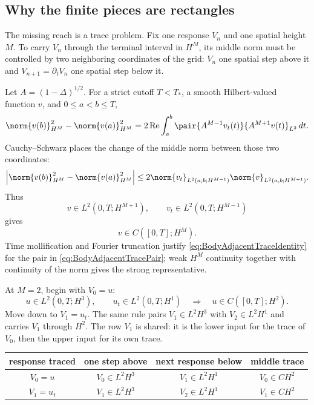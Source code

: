 \subsection{Why the finite pieces are rectangles}\label{sub:BodyFiniteAdjacentRectangles}

The missing reach is a trace problem.
Fix one response \(V_n\) and one spatial height \(M\).
To carry \(V_n\) through the terminal interval in \(H^M\), its middle norm must be controlled by two neighboring coordinates of the grid: \(V_n\) one spatial step above it and \(V_{n+1}=\partial_tV_n\) one spatial step below it.

Let \(A=(1-\Delta)^{1/2}\).
For a strict cutoff \(T<T_*\), a smooth Hilbert-valued function \(v\), and \(0\leq a<b\leq T\),
\begin{equation}\label{eq:BodyAdjacentTraceIdentity}
  \norm{v(b)}_{H^M}^2-
  \norm{v(a)}_{H^M}^2
  =2\operatorname{Re}
  \int_a^b
  \pair{A^{M-1}v_t(t)}{A^{M+1}v(t)}_{L^2}\,dt.
\end{equation}
Cauchy--Schwarz places the change of the middle norm between those two coordinates:
\[
  \left|
  \norm{v(b)}_{H^M}^2-
  \norm{v(a)}_{H^M}^2
  \right|
  \leq
  2\norm{v_t}_{L^2(a,b;H^{M-1})}
   \norm{v}_{L^2(a,b;H^{M+1})}.
\]
Thus
\begin{equation}\label{eq:BodyAdjacentTracePair}
  v\in L^2(0,T;H^{M+1}),
  \qquad
  v_t\in L^2(0,T;H^{M-1})
\end{equation}
gives
\begin{equation}\label{eq:BodyAdjacentTraceConclusion}
  v\in C([0,T];H^M).
\end{equation}
Time mollification and Fourier truncation justify
\eqref{eq:BodyAdjacentTraceIdentity} for the pair in
\eqref{eq:BodyAdjacentTracePair}; weak \(H^M\) continuity together with continuity
of the norm gives the strong representative.

At \(M=2\), begin with \(V_0=u\):
\begin{equation}\label{eq:FirstConcreteAdjacentPair}
  u\in L^2(0,T;H^3),
  \qquad
  u_t\in L^2(0,T;H^1)
  \quad\Longrightarrow\quad
  u\in C([0,T];H^2).
\end{equation}
Move down to \(V_1=u_t\).
The same rule pairs \(V_1\in L^2H^3\) with \(V_2\in L^2H^1\) and carries \(V_1\) through \(H^2\).
The row \(V_1\) is shared: it is the lower input for the trace of \(V_0\), then the upper input for its own trace.

\begin{center}
\captionsetup{hypcap=false}
\label{tab:FirstAdjacentRectangle}
\renewcommand{\arraystretch}{1.35}
\begin{tabular}{@{}c c c c@{}}
\toprule
response traced & one step above & next response below & middle trace \\
\midrule
\(V_0=u\) & \(V_0\in L^2H^3\) & \(V_1\in L^2H^1\) & \(V_0\in CH^2\) \\
\(V_1=u_t\) & \(V_1\in L^2H^3\) & \(V_2\in L^2H^1\) & \(V_1\in CH^2\) \\
\bottomrule
\end{tabular}
\end{center}

